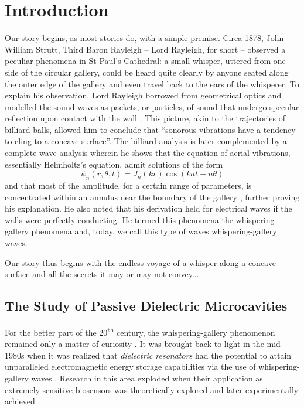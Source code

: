 \chapter{Introduction}

Our story begins, as most stories do, with a simple premise. 
Circa 1878, John William Strutt, Third Baron Rayleigh -- Lord Rayleigh, for short -- 
observed a peculiar phenomena in 
St Paul's Cathedral: a small whisper, uttered from one side of the circular
gallery, could be heard quite clearly by anyone seated along the outer edge of the gallery
and even travel back to the ears of the whisperer.
To explain his observation, Lord Rayleigh borrowed from geometrical optics
and modelled the sound waves as packets, or particles, of sound that undergo
specular reflection upon contact with the wall \cite[\S287]{RAY1878}. 
This picture, akin to the trajectories of billiard balls, allowed him to 
conclude that ``sonorous vibrations have a tendency to cling to a concave surface''.
The billiard analysis is later complemented by a complete wave analysis wherein 
he shows that the equation of aerial vibrations, essentially Helmholtz's equation, 
admit solutions of the form
  \begin{equation*}
   \psi_n(r,\theta,t)=J_n(kr)\cos(kat-n\theta)
  \end{equation*}
and that most of the amplitude, for a certain range of parameters, 
is concentrated within an annulus near the boundary of the gallery \cite{RAY1910}, 
further proving his explanation.
He also noted that his derivation held for electrical waves if the walls
were perfectly conducting. He termed this phenomena the whispering-gallery 
phenomena and, today, we call this type of waves whispering-gallery waves.

Our story thus begins with the endless voyage of a whisper
along a concave surface and all the secrets it may or may not
convey...

\section{The Study of Passive Dielectric Microcavities}

For the better part of the 20\textsuperscript{th} century, the whispering-gallery 
phenomenon remained only a matter of curiosity \cite{WRI2012}. It was brought
back to light in the mid-1980s when it was realized that \textit{dielectric resonators}
had the potential to attain unparalleled electromagnetic energy storage
capabilities via the use of whispering-gallery waves \cite{YAM1993}.
Research in this area exploded when their application as 
extremely sensitive biosensors was theoretically explored 
and later experimentally achieved \cite{SER95,VOL2002,ARM2003,VOL2008}.

